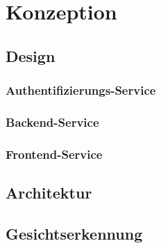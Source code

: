 \chapter{Konzeption}
\section{Design}
\subsection{Authentifizierungs-Service}
\subsection{Backend-Service}
\subsection{Frontend-Service}
\section{Architektur}
\section{Gesichtserkennung}